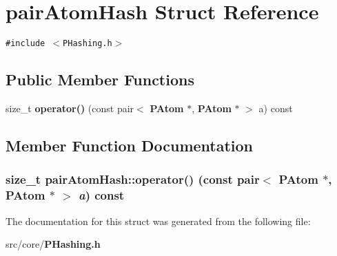 \section{pair\-Atom\-Hash Struct Reference}
\label{structpairAtomHash}
{\tt \#include $<$PHashing.h$>$}

\subsection*{Public Member Functions}
\begin{CompactItemize}
\item 
size\_\-t {\bf operator()} (const pair$<$ {\bf PAtom} $\ast$, {\bf PAtom} $\ast$ $>$ a) const
\end{CompactItemize}


\subsection{Member Function Documentation}
\subsubsection{\setlength{\rightskip}{0pt plus 5cm}size\_\-t pair\-Atom\-Hash::operator() (const pair$<$ {\bf PAtom} $\ast$, {\bf PAtom} $\ast$ $>$ {\em a}) const\hspace{0.3cm}{\tt  [inline]}}\label{structpairAtomHash_ffb2dd181ea3209c36f8eb15fbe08db6}




The documentation for this struct was generated from the following file:\begin{CompactItemize}
\item 
src/core/{\bf PHashing.h}\end{CompactItemize}
